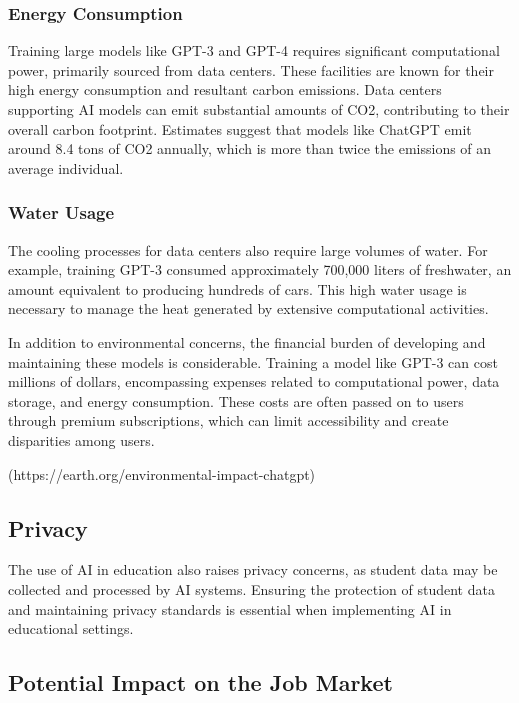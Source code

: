 \documentclass{article}
\begin{document}
\subsubsection{Energy Consumption}

Training large models like GPT-3 and GPT-4 requires significant computational power, primarily sourced from data centers. These facilities are known for their high energy consumption and resultant carbon emissions. Data centers supporting AI models can emit substantial amounts of CO2, contributing to their overall carbon footprint. Estimates suggest that models like ChatGPT emit around 8.4 tons of CO2 annually, which is more than twice the emissions of an average individual.

\subsubsection{Water Usage}

The cooling processes for data centers also require large volumes of water. For example, training GPT-3 consumed approximately 700,000 liters of freshwater, an amount equivalent to producing hundreds of cars. This high water usage is necessary to manage the heat generated by extensive computational activities.

In addition to environmental concerns, the financial burden of developing and maintaining these models is considerable. Training a model like GPT-3 can cost millions of dollars, encompassing expenses related to computational power, data storage, and energy consumption. These costs are often passed on to users through premium subscriptions, which can limit accessibility and create disparities among users.

(https://earth.org/environmental-impact-chatgpt)


\subsection{Privacy}

The use of AI in education also raises privacy concerns, as student data may be collected and processed by AI systems. Ensuring the protection of student data and maintaining privacy standards is essential when implementing AI in educational settings.

\subsection{Potential Impact on the Job Market}
\end{document}
